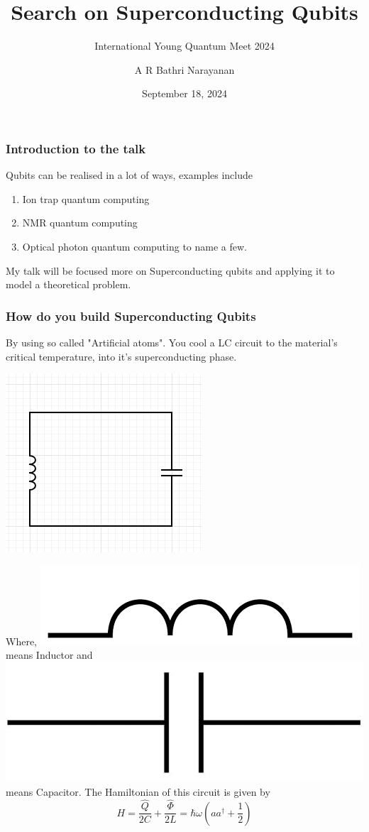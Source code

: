 \documentclass[11pt]{beamer}
\begin{document}
	\author{A R Bathri Narayanan}
	\title{Search on Superconducting Qubits}
	\subtitle{International Young Quantum Meet 2024}
	\date{September 18, 2024}
	\subject{}
	\begin{frame}[plain]
		\maketitle
	\end{frame}
	
	\begin{frame}
		\frametitle{Introduction to the talk}
		Qubits can be realised in a lot of ways, examples include
		\begin{enumerate}
			\item  Ion trap quantum computing
			\item NMR quantum computing
			\item Optical photon quantum computing to name a few.
		\end{enumerate}
	My talk will be focused more on Superconducting qubits and applying it to model a theoretical problem.
	\end{frame}
	
		\begin{frame}
		\frametitle{How do you build Superconducting Qubits}
		By using so called "Artificial atoms". You cool a LC circuit to the material's critical temperature, into it's superconducting phase.\\
		\begin{center}
		\includegraphics[width=3 cm]{sc1.png}
		\end{center}
		Where,
		\includegraphics[width=1 cm]{sc2.png} means Inductor and \includegraphics[width=1 cm]{sc3.jpg} means Capacitor. The Hamiltonian of this circuit is given by
		\[H=\frac{\hat{Q}}{2C}+\frac{\hat{\Phi}}{2L}=\hbar\omega(aa^{\dagger}+\frac{1}{2})\]
		\end{frame}
		
\end{document}

